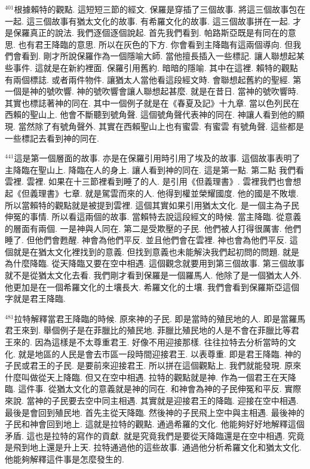 \documentclass{book}
\begin{document}
$^{401}$根據賴特的觀點.
這短短三節的經文.
保羅是穿插了三個故事.
將這三個故事包在一起.
這三個故事有猶太文化的故事.
有希羅文化的故事.
這三個故事拼在一起.
才是保羅真正的說法.
我們逐個逐個說起.
首先我們看到.
帕路斯亞既是有同在的意思.
也有君王降臨的意思.
所以在灰色的下方.
你會看到主降臨有這兩個導向.
但我們會看到.
剛才所說保羅作為一個隱喻大師.
當他擅長插入一些標記.
讓人聯想起某些事件.
這就是在新約裡面.
保羅引用舊約.
暗暗的隱喻.
其中在這裡.
賴特的觀點有兩個標誌.
或者兩件物件.
讓猶太人當他看這段經文時.
會聯想起舊約的聖經.
第一個是神的號吹響.
神的號吹響會讓人聯想起甚麼.
就是在昔日.
當神的號吹響時.
其實也標誌著神的同在.
其中一個例子就是在《春夏及記》十九章.
當以色列民在西賴的聖山上.
他會不斷聽到號角聲.
這個號角聲代表神的同在.
神讓人看到他的顯現.
當然除了有號角聲外.
其實在西賴聖山上也有蜜雲.
有蜜雲 有號角聲.
這些都是一些標記去看到神的同在.

$^{441}$這是第一個層面的故事.
亦是在保羅引用時引用了埃及的故事.
這個故事表明了主降臨在聖山上.
降臨在人的身上.
讓人看到神的同在.
這是第一點.
第二點 我們看雲裡.
雲裡.
如果在十三節裡看到睡了的人.
是引用《但義理書》.
雲裡我們也會想起《但義理書》七章.
就是駕雲而來的人.
他得到權並榮耀國度.
他的國是不敗壞.
所以當賴特的觀點就是被提到雲裡.
這個其實如果引用猶太文化.
是一個主為子民伸冤的事情.
所以看這兩個的故事.
當賴特去說這段經文的時候.
當主降臨.
從意義的層面有兩個.
一是神與人同在.
第二是受欺壓的子民.
他們被人打得很厲害.
他們睡了.
但他們會甦醒.
神會為他們平反.
並且他們會在雲裡.
神也會為他們平反.
這個就是在猶太文化裡找到的意義.
但找到意義也未能解決我們起初問的問題.
就是為什麼降臨.
從天降臨又要在空中相遇.
這個觀念就要用到第三個故事.
第三個故事就不是從猶太文化去看.
我們剛才看到保羅是一個羅馬人.
他除了是一個猶太人外.
他更加是在一個希羅文化的土壤長大.
希羅文化的土壤.
我們會看到保羅斯亞這個字就是君王降臨.

$^{481}$拉特解釋當君王降臨的時候.
原來神的子民.
即是當時的殖民地的人.
即是當羅馬君王來到.
舉個例子是在菲臘比的殖民地.
菲臘比殖民地的人是不會在菲臘比等君王來的.
因為這樣是不太尊重君王.
好像不用迎接那樣.
往往拉特去分析當時的文化.
就是地區的人民是會去市區一段時間迎接君王.
以表尊重.
即是君王降臨.
神的子民或君王的子民.
是要前來迎接君王.
所以拼在這個觀點上.
我們就能發現.
原來什麼叫做從天上降臨.
但又在空中相遇.
拉特的觀點就是神.
作為一個君王在天降臨.
這件事.
從猶太文化的意義就是神的同在.
和神會為神的子民伸冤和平反.
實際來說.
當神的子民要去空中同主相遇.
其實就是迎接君王的降臨.
迎接在空中相遇.
最後是會回到殖民地.
首先主從天降臨.
然後神的子民飛上空中與主相遇.
最後神的子民和神會回到地上.
這就是拉特的觀點.
通過希羅的文化.
他能夠好好地解釋這個矛盾.
這也是拉特的寫作的貢獻.
就是究竟我們是要從天降臨還是在空中相遇.
究竟是飛到地上還是升上天.
拉特通過他的這些故事.
通過他分析希羅文化和猶太文化.
他能夠解釋這件事是怎麼發生的.
\end{document}
